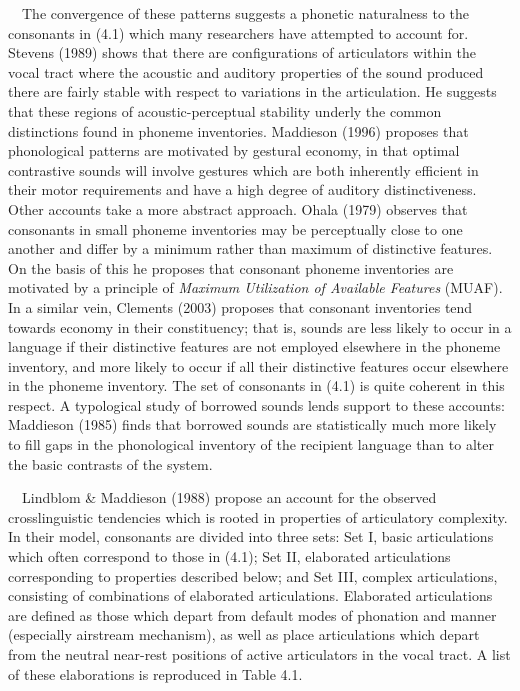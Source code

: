 \documentclass[12pt]{article}
\newenvironment{styleBody}{\renewcommand\baselinestretch{1.0}\setlength\leftskip{0in}\setlength\rightskip{0in plus 1fil}\setlength\parindent{0in}\setlength\parfillskip{0pt plus 1fil}\setlength\parskip{0in plus 1pt}\writerlistparindent\writerlistleftskip\leavevmode\normalfont\normalsize\fontsize{11pt}{13.2pt}\selectfont\mdseries\upshape\writerlistlabel\ignorespaces}{\unskip\vspace{0in plus 1pt}\par}
\newcommand\writerlistleftskip{}
\newcommand\writerlistparindent{}
\newcommand\writerlistlabel{}
\begin{document}
\begin{styleBody}
\ \ The convergence of these patterns suggests a phonetic naturalness to the consonants in (4.1) which many researchers have attempted to account for. Stevens (1989) shows that there are configurations of articulators within the vocal tract where the acoustic and auditory properties of the sound produced there are fairly stable with respect to variations in the articulation. He suggests that these regions of acoustic-perceptual stability underly the common distinctions found in phoneme inventories. Maddieson (1996) proposes that phonological patterns are motivated by gestural economy, in that optimal contrastive sounds will involve gestures which are both inherently efficient in their motor requirements and have a high degree of auditory distinctiveness. Other accounts take a more abstract approach. Ohala (1979) observes that consonants in small phoneme inventories may be perceptually close to one another and differ by a minimum rather than maximum of distinctive features. On the basis of this he proposes that consonant phoneme inventories are motivated by a principle of \textit{Maximum Utilization of Available Features }(MUAF). In a similar vein, Clements (2003) proposes that consonant inventories tend towards economy in their constituency; that is, sounds are less likely to occur in a language if their distinctive features are not employed elsewhere in the phoneme inventory, and more likely to occur if all their distinctive features occur elsewhere in the phoneme inventory. The set of consonants in (4.1) is quite coherent in this respect. A typological study of borrowed sounds lends support to these accounts: Maddieson (1985) finds that borrowed sounds are statistically much more likely to fill gaps in the phonological inventory of the recipient language than to alter the basic contrasts of the system.
\end{styleBody}

\begin{styleBody}
\ \ Lindblom \& Maddieson (1988) propose an account for the observed crosslinguistic tendencies which is rooted in properties of articulatory complexity. In their model, consonants are divided into three sets: Set I, basic articulations which often correspond to those in (4.1); Set II, elaborated articulations corresponding to properties described below; and Set III, complex articulations, consisting of combinations of elaborated articulations. Elaborated articulations are defined as those which depart from default modes of phonation and manner (especially airstream mechanism), as well as place articulations which depart from the neutral near-rest positions of active articulators in the vocal tract. A list of these elaborations is reproduced in Table 4.1.
\end{styleBody}
\end{document}
